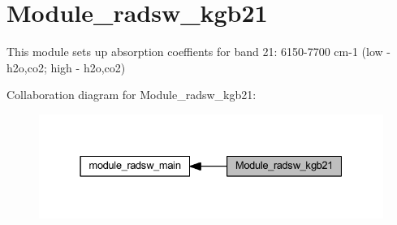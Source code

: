 \hypertarget{group__module__radsw__kgb21}{}\section{Module\+\_\+radsw\+\_\+kgb21}
\label{group__module__radsw__kgb21}


This module sets up absorption coeffients for band 21\+: 6150-\/7700 cm-\/1 (low -\/ h2o,co2; high -\/ h2o,co2)  


Collaboration diagram for Module\+\_\+radsw\+\_\+kgb21\+:\nopagebreak
\begin{figure}[H]
\begin{center}
\leavevmode
\includegraphics[width=331pt]{group__module__radsw__kgb21}
\end{center}
\end{figure}
